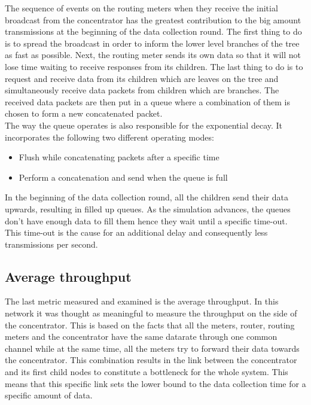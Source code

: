 The sequence of events on the routing meters when they receive the initial broadcast from the concentrator has the greatest contribution to the big amount transmissions at the beginning of the data collection round. The first thing to do is to spread the broadcast in order to inform the lower level branches of the tree as fast as possible. Next, the routing meter sends its own data so that it will not lose time waiting to receive responses from its children. The last thing to do is to request and receive data from its children which are leaves on the tree and simultaneously receive data packets from children which are branches. The received data packets are then put in a queue where a combination of them is chosen to form a new concatenated packet.\\
The way the queue operates is also responsible for the exponential decay. It incorporates the following two different operating modes:

\begin{itemize}
\item Flush while concatenating packets after a specific time
\item Perform a concatenation and send when the queue is full
\end{itemize}
In the beginning of the data collection round, all the children send their data upwards, resulting in filled up queues. As the simulation advances, the queues don't have enough data to fill them hence they wait until a specific time-out. This time-out is the cause for an additional delay and consequently less transmissions per second.



\subsection{Average throughput}
The last metric measured and examined is the average throughput. In this network it was thought as meaningful to measure the throughput on the side of the concentrator. This is based on the facts that all the meters, router, routing meters and the concentrator have the same datarate through one common channel while at the same time, all the meters try to forward their data towards the concentrator. This combination results in the link between the concentrator and its first child nodes to constitute a bottleneck for the whole system. This means that this specific link sets the lower bound to the data collection time for a specific amount of data.


